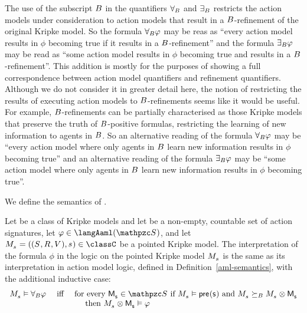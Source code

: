 The use of the subscript $B$ in the quantifiers ${\forall_{B}}$ and ${\exists_{B}}$ restricts the action models under consideration to action models that result in a $B$-refinement of the original Kripke model.
So the formula ${\forall_{B}} \varphi$ may be reas as ``every action model results in $\phi$ becoming true if it results in a $B$-refinement'' and the formula ${\exists_{B}} \varphi$ may be read as ``some action model results in $\phi$ becoming true and results in a $B$-refinement''.
This addition is mostly for the purposes of showing a full correspondence between action model quantifiers and refinement quantifiers.
Although we do not consider it in greater detail here, the notion of restricting the results of executing action models to $B$-refinements seems like it would be useful.
For example, $B$-refinements can be partially characterised as those Kripke models that preserve the truth of $B$-positive formulas, restricting the learning of new information to agents in $B$.
So an alternative reading of the formula ${\forall_{B}} \varphi$ may be ``every action model where only agents in $B$ learn new information results in $\phi$ becoming true'' and an alternative reading of the formula ${\exists_{B}} \varphi$ may be ``some action model where only agents in $B$ learn new information results in $\phi$ becoming true''.

We define the semantics of \logicAaml{}.

\begin{definition}
Let \classC{} be a class of Kripke models and let \aSignatureFamily{} be a non-empty, countable set of action signatures, let $\phi \in \langAaml(\aSignatureFamily)$, and let $\kPModelAndTuple{\kStateS} \in \classC$ be a pointed Kripke model.
The interpretation of the formula $\phi$ in the logic \logicAamlC{} on the pointed Kripke model $\kPModel{\kStateS}$ is the same as its interpretation in action model logic, defined in Definition~\ref{aml-semantics}, with the additional inductive case:
$$
\begin{array}{lcl}
    \kPModel{\kStateS} \entails \allactsBs \phi & \text{ iff } & \text{for every } \aPModel{\aStateS} \in \aSignatureFamily \text{ if } \kPModel{\kStateS} \entails \aPrecondition(\aStateS) \text{ and } \kPModel{\kStateS} \simulatesBs \kPModel{\kStateS} \exec \aPModel{\aStateS}\\&&\quad \text{ then } \kPModel{\kStateS} \exec \aPModel{\aStateS} \entails \phi
\end{array}
$$
\end{definition}

